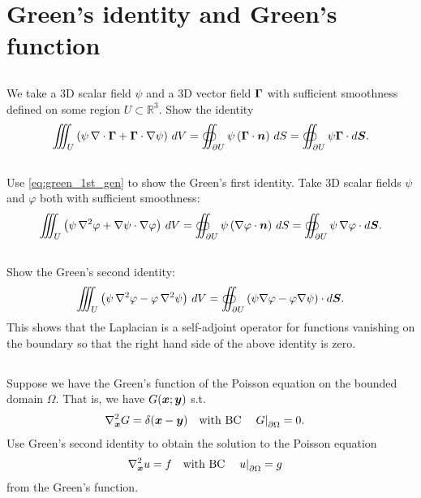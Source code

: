 \documentclass[11pt,letterpaper]{article}
\begin{document}
\section{Green's identity and Green's function}
\subsection{}
We take a 3D scalar field $\psi$ and a 3D vector field $\boldsymbol{\Gamma}$ with sufficient smoothness defined on some region $U \subset \mathbb{R}^3$. Show the identity
\begin{align}
    \iiint_U \left( \psi \, \nabla \cdot \boldsymbol{\Gamma} + \boldsymbol{\Gamma} \cdot \nabla \psi\right)\, dV  = \oiint_{\partial U} \psi \left( \boldsymbol{\Gamma} \cdot \boldsymbol{n} \right)\, dS=\oiint_{\partial U}\psi\boldsymbol{\Gamma}\cdot d\boldsymbol{S}.\label{eq:green_1st_gen}
\end{align}

\subsection{}
Use \eqref{eq:green_1st_gen} to show the Green's first identity. Take 3D scalar fields $\psi$ and $\varphi$ both with sufficient smoothness:
\begin{align}
    \iiint_U \left( \psi \, \nabla^2 \varphi + \nabla \psi \cdot \nabla \varphi \right)\, dV  = \oiint_{\partial U} \psi \left( \nabla \varphi \cdot \boldsymbol{n} \right)\, dS=\oiint_{\partial U}\psi\,\nabla\varphi\cdot d\boldsymbol{S}.
\end{align}

\subsection{}
Show the Green's second identity:
\begin{align}
    \iiint_U \left( \psi \, \nabla^2 \varphi - \varphi \, \nabla^2 \psi\right)\, dV = \oiint_{\partial U} \left( \psi \nabla \varphi - \varphi \nabla \psi\right)\cdot d\boldsymbol{S}.
\end{align}
This shows that the Laplacian is a self-adjoint operator for functions vanishing on the boundary so that the right hand side of the above identity is zero.

\subsection{}
Suppose we have the Green's function of the Poisson equation on the bounded domain $\Omega$. That is, we have $G(\boldsymbol{x};\boldsymbol{y})$ s.t.
\begin{align}
    &\nabla_{\boldsymbol{x}}^2 G = \delta(\boldsymbol{x}-\boldsymbol{y})\quad \mbox{with BC} \quad \left.G\right|_{\partial\Omega} = 0.
\end{align}
Use Green's second identity to obtain the solution to the Poisson equation
\begin{align}
    &\nabla_{\boldsymbol{x}}^2 u = f\quad \mbox{with BC} \quad \left.u\right|_{\partial\Omega} = g
\end{align}
from the Green's function.
\end{document}
